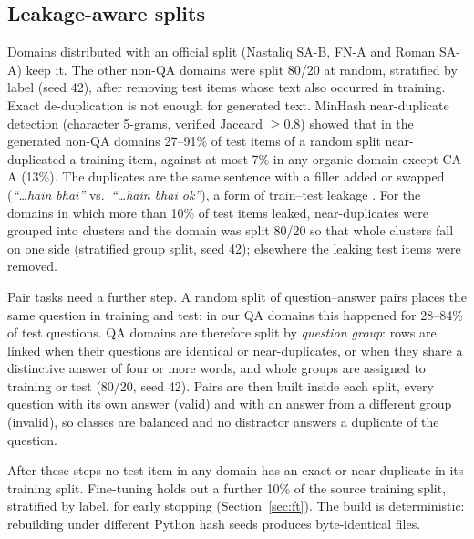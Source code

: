 \documentclass[acmsmall,screen]{acmart}
\begin{document}
\begin{enumerate}[leftmargin=*,itemsep=2pt]
\end{enumerate}

\begin{table}[t]
\centering\small
\caption{Candidate domains excluded by the inclusion criteria of Section~\ref{sec:criteria}.}
\label{tab:dropped}
\resizebox{\textwidth}{!}{}
\end{table}

\subsection{Leakage-aware splits}\label{sec:splits}
Domains distributed with an official split (Nastaliq SA-B, FN-A and Roman SA-A) keep it. The other non-QA domains were split 80/20 at random, stratified by label (seed 42), after removing test items whose text also occurred in training. Exact de-duplication is not enough for generated text. MinHash near-duplicate detection \citep{broder1997resemblance} (character 5-grams, verified Jaccard $\geq 0.8$) showed that in the generated non-QA domains 27--91\% of test items of a random split near-duplicated a training item, against at most 7\% in any organic domain except CA-A (13\%). The duplicates are the same sentence with a filler added or swapped (\textit{``\dots hain bhai''} vs.\ \textit{``\dots hain bhai ok''}), a form of train--test leakage \citep{elangovan2021memorization}. For the \NumResplit{} domains in which more than 10\% of test items leaked, near-duplicates were grouped into clusters and the domain was split 80/20 so that whole clusters fall on one side (stratified group split, seed 42); elsewhere the leaking test items were removed.

Pair tasks need a further step. A random split of question--answer pairs places the same question in training and test: in our QA domains this happened for 28--84\% of test questions. QA domains are therefore split by \emph{question group}: rows are linked when their questions are identical or near-duplicates, or when they share a distinctive answer of four or more words, and whole groups are assigned to training or test (80/20, seed 42). Pairs are then built inside each split, every question with its own answer (valid) and with an answer from a different group (invalid), so classes are balanced and no distractor answers a duplicate of the question.

After these steps no test item in any domain has an exact or near-duplicate in its training split. Fine-tuning holds out a further 10\% of the source training split, stratified by label, for early stopping (Section~\ref{sec:ft}). The build is deterministic: rebuilding under different Python hash seeds produces byte-identical files.
\end{document}
